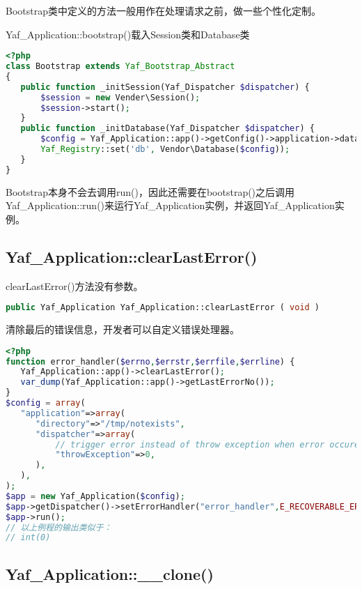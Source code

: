 Bootstrap类中定义的方法一般用作在处理请求之前，做一些个性化定制。


\begin{example}
Yaf\_Application::bootstrap()载入Session类和Database类
\begin{lstlisting}[language=PHP]
<?php
class Bootstrap extends Yaf_Bootstrap_Abstract 
{
   public function _initSession(Yaf_Dispatcher $dispatcher) {
       $session = new Vender\Session();
       $session->start();
   }
   public function _initDatabase(Yaf_Dispatcher $dispatcher) {
       $config = Yaf_Application::app()->getConfig()->application->database;
       Yaf_Registry::set('db', Vendor\Database($config));
   }
}
\end{lstlisting}
\end{example}

Bootstrap本身不会去调用run()，因此还需要在bootstrap()之后调用Yaf\_Application::run()来运行Yaf\_Application实例，并返回Yaf\_Application实例。



\subsection{Yaf\_Application::clearLastError()}

clearLastError()方法没有参数。

\begin{lstlisting}[language=PHP]
public Yaf_Application Yaf_Application::clearLastError ( void )
\end{lstlisting}

清除最后的错误信息，开发者可以自定义错误处理器。


\begin{lstlisting}[language=PHP]
<?php
function error_handler($errno,$errstr,$errfile,$errline) {
   Yaf_Application::app()->clearLastError();
   var_dump(Yaf_Application::app()->getLastErrorNo());
}
$config = array(
   "application"=>array(
      "directory"=>"/tmp/notexists",
      "dispatcher"=>array(
          // trigger error instead of throw exception when error occure
          "throwException"=>0,
      ),
   ),
);
$app = new Yaf_Application($config);
$app->getDispatcher()->setErrorHandler("error_handler",E_RECOVERABLE_ERROR);
$app->run();
// 以上例程的输出类似于：
// int(0)
\end{lstlisting}





\subsection{Yaf\_Application::\_\_clone()}

